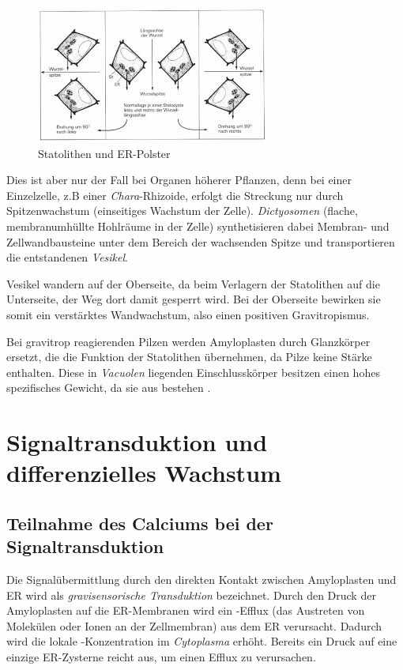 \documentclass[
a4paper, 
11pt, 
ngerman,
listof=totoc,
bibliography=totocnumbered,
abstracton
]{scrreprt}
\begin{document}
 \begin{figure}[H]
 	\centering 
 	\includegraphics[width = 0.5\linewidth]{bilder/Graviperzeption.jpeg}
 	\caption{Statolithen und ER-Polster  \label{Graviperzeption}}
 \end{figure} 

Dies ist aber nur der Fall bei Organen höherer Pflanzen, denn bei einer Einzelzelle, z.B einer \emph{Chara}-Rhizoide, erfolgt die Streckung nur durch Spitzenwachstum (einseitiges Wachstum der Zelle).
\emph{Dictyosomen} (flache, membranumhüllte Hohlräume in der Zelle) synthetisieren dabei Membran- und Zellwandbausteine unter dem Bereich der wachsenden Spitze und transportieren  die entstandenen \emph{Vesikel}.

Vesikel wandern auf der Oberseite, da beim Verlagern der Statolithen auf die Unterseite, der Weg dort damit gesperrt wird. Bei der Oberseite bewirken sie somit ein verstärktes Wandwachstum, also einen positiven Gravitropismus.

Bei gravitrop reagierenden Pilzen werden Amyloplasten durch {\glqq Glanzkörper\grqq} ersetzt, die die Funktion der Statolithen übernehmen, da Pilze keine Stärke enthalten. Diese in \emph{Vacuolen} liegenden Einschlusskörper besitzen einen hohes spezifisches Gewicht, da sie aus  bestehen \parencite[453f]{Strasburger}.




\section{Signaltransduktion und differenzielles Wachstum}

\subsection{Teilnahme des Calciums bei der Signaltransduktion}

Die Signalübermittlung durch den direkten Kontakt zwischen Amyloplasten und ER wird als \emph{gravisensorische Transduktion} bezeichnet.
Durch den Druck der Amyloplasten auf die ER-Membranen wird ein -Efflux (das Austreten von Molekülen oder Ionen an der Zellmembran) aus dem ER verursacht.
Dadurch wird die lokale -Konzentration im  \emph{Cytoplasma} erhöht. 
Bereits ein Druck auf eine einzige ER-Zysterne reicht aus, um einen Efflux zu verursachen.
\end{document}
